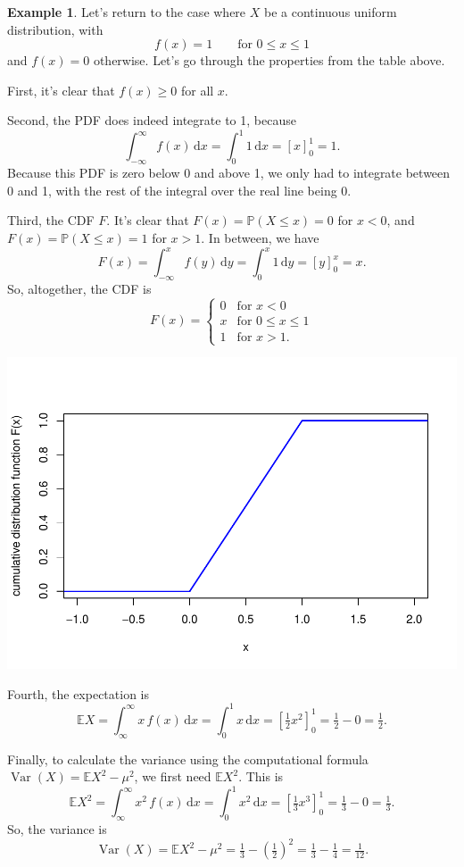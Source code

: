 \documentclass[
  a4paper,
]{book}
\theoremstyle{definition}
\theoremstyle{definition}
\newtheorem{example}{Example}[chapter]
\theoremstyle{definition}
\theoremstyle{definition}
\theoremstyle{remark}
\begin{document}
\begin{example}
Let's return to the case where \(X\) be a continuous uniform distribution, with
\[  f(x) = 1 \qquad \text{for $0 \leq x \leq 1$}  \]
and \(f(x) = 0\) otherwise. Let's go through the properties from the table above.

First, it's clear that \(f(x) \geq 0\) for all \(x\).

Second, the PDF does indeed integrate to 1, because
\[ \int_{-\infty}^\infty f(x) \, \mathrm dx = \int_0^1 1 \, \mathrm dx = [x]_0^1 = 1 .    \]
Because this PDF is zero below 0 and above 1, we only had to integrate between 0 and 1, with the rest of the integral over the real line being 0.

Third, the CDF \(F\). It's clear that \(F(x) = \mathbb P(X \leq x) = 0\) for \(x < 0\), and \(F(x) = \mathbb P(X \leq x) = 1\) for \(x > 1\). In between, we have
\[ F(x) = \int_{-\infty}^x f(y) \,\mathrm dy = \int_0^x 1\, \mathrm dy = [y]_0^x = x .   \]
So, altogether, the CDF is
\[  F(x) = \begin{cases} 0 & \text{for } x < 0 \\ x & \text{for }0 \leq x \leq 1 \\ 1 & \text{for }x > 1 . \end{cases} \]

\includegraphics{math1710_files/figure-latex/contunif-cdf-1.pdf}

Fourth, the expectation is
\[ \mathbb EX = \int_{\infty}^\infty x\,f(x)\,\mathrm dx = \int_0^1 x \, \mathrm dx = \left[\tfrac12 x^2 \right]_0^1 = \tfrac12 - 0 = \tfrac12 .   \]

Finally, to calculate the variance using the computational formula \(\operatorname{Var}(X) = \mathbb EX^2 - \mu^2\), we first need \(\mathbb EX^2\). This is
\[ \mathbb EX^2 = \int_{\infty}^\infty x^2\,f(x)\,\mathrm dx = \int_0^1 x^2 \, \mathrm dx = \left[\tfrac13 x^3 \right]_0^1 = \tfrac13 - 0 = \tfrac13 .   \]
So, the variance is
\[ \operatorname{Var}(X) = \mathbb EX^2 - \mu^2 = \tfrac13 - \left(\tfrac12\right)^2 = \tfrac13 - \tfrac14 = \tfrac{1}{12} . \]
\end{example}
\end{document}
